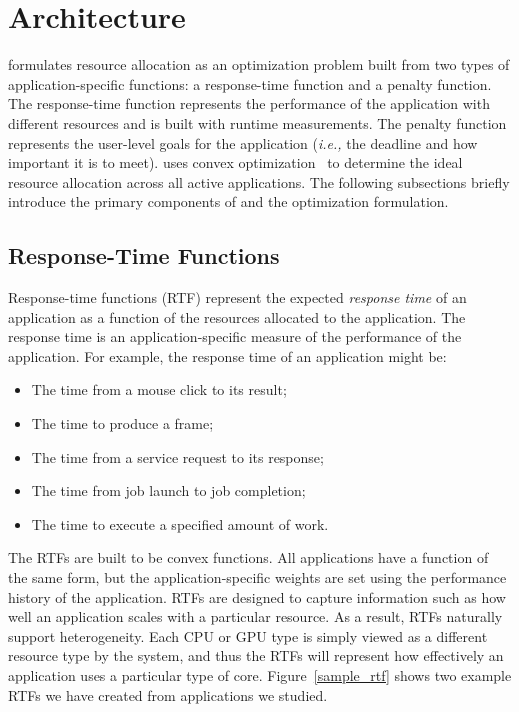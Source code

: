 \section{\pacora Architecture}\label{sys_design}
\pacora formulates resource allocation as an optimization problem
built from two types of application-specific functions: a
response-time function and a penalty function. The response-time
function represents the performance of the application with different
resources and is built with runtime measurements.  The penalty
function represents the user-level goals for the application
(\emph{i.e.,} the deadline and how important it is to meet). \pacora uses convex optimization~\cite{BoVa} to
determine the ideal resource allocation across all active
applications.  The following subsections briefly introduce the primary
components of \pacora and the optimization formulation.

\subsection{Response-Time Functions}

Response-time functions (RTF) represent the expected \emph{response
  time} of an application as a function of the resources allocated to
the application. The response time is an application-specific measure
of the performance of the application.  For example, the response time
of an application might be:
    \begin{itemize}\itemsep0pt \parskip0pt 
    \item The time from a mouse click to its result;
    \item The time to produce a frame;
    \item The time from a service request to its response;
    \item The time from job launch to job completion;
    \item The time to execute a specified amount of work.
    \end{itemize}

The RTFs are built to be convex functions.  All applications have a
function of the same form, but the application-specific weights are set
using the performance history of the application.  RTFs are designed
to capture information such as how well an application scales with a
particular resource. As a result, RTFs naturally support
heterogeneity.  Each CPU or GPU type is simply viewed as a different
resource type by the system, and thus the RTFs will represent how
effectively an application uses a particular type of
core. Figure~\ref{sample_rtf} shows two example RTFs we have created
from applications we studied.

